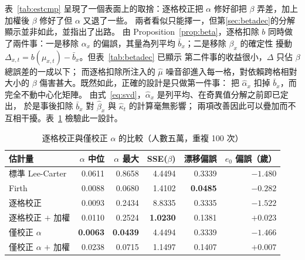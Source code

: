 \documentclass[UTF8, fontset=macnew, a4paper, 12pt]{ctexart}
\begin{document}
表~\ref{tab:estcmp} 呈現了一個表面上的取捨：逐格校正把 $\alpha$ 修好卻把
$\beta$ 弄差，加上加權後 $\beta$ 修好了但 $\alpha$ 又退了一些。
兩者看似只能擇一，但第\ref{sec:betadec}的分解顯示並非如此，並指出了出路。
由 Proposition~\ref{prop:beta}，逐格扣除 $b$ 同時做了兩件事：一是移除
$\alpha_x$ 的偏誤，其量為列平均 $\bar b_x$；二是移除 $\beta_x$ 的確定性
擾動 $\Delta_{x,t}=b(\mu_{x,t})-\bar b_x$。但表~\ref{tab:betadec} 已顯示
第二件事的收益很小，$\Delta$ 只佔 $\beta$ 總誤差的一成以下；
而逐格扣除所注入的 $\hat\mu$ 噪音卻進入每一格，對依賴跨格相對大小的
$\beta$ 傷害甚大。既然如此，正確的設計是只做第一件事：
把 $\hat\alpha_x$ 扣掉 $\bar b_x$，而完全不動中心化矩陣。
由式~\eqref{eq:svd}，$\hat\alpha_x$ 是列平均、在奇異值分解之前即已定出，
於是事後扣除 $\bar b_x$ 對 $\hat\beta_x$ 與 $\hat\kappa_t$ 的計算毫無影響；
兩項改善因此可以疊加而不互相干擾。表~\ref{tab:joint} 檢驗此一設計。

\begin{table}[H]
\centering
\caption{逐格校正與僅校正 $\alpha$ 的比較（人數五萬，重複 100 次）}
\small
\begin{tabular}{lrrrrr}
\toprule
估計量 & $\alpha$ 中位 & $\alpha$ 最大 & SSE($\beta$) & 漂移偏誤 & $e_0$ 偏誤（歲）\\
\midrule
標準 Lee-Carter              & 0.0611 & 0.8658 & 4.4494 & 0.3339 & $-1.480$\\
Firth                & 0.0088 & 0.0680 & 1.4102 & \textbf{0.0485} & $-0.282$\\
逐格校正             & 0.0093 & 0.2434 & 8.8335 & 0.3335 & $-1.522$\\
逐格校正 $+$ 加權     & 0.0110 & 0.2524 & \textbf{1.0230} & 0.1381 & $+0.023$\\
僅校正 $\alpha$      & \textbf{0.0063} & \textbf{0.0439} & 4.4494 & 0.3339 & $-1.466$\\
僅校正 $\alpha$ $+$ 加權 & 0.0238 & 0.0715 & 1.1497 & 0.1407 & \textbf{$+0.007$}\\
\bottomrule
\end{tabular}
\label{tab:joint}
\end{table}
\end{document}
